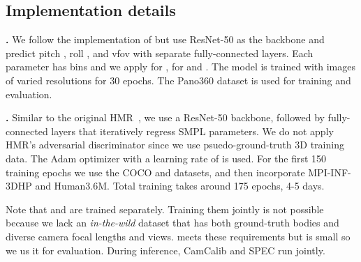 \documentclass[10pt,twocolumn,letterpaper,usenames,dvipsnames]{article}
\begin{document}
\begin{table}[]
    \centering
    \vspace{-0.05in}
    \caption{{\bf Regressing camera parameters.} \camcalib methods are trained and tested on the Pano360 dataset. ScaleNet~\cite{zhu2020single} results use the authors' implementation.
    }
    \vspace{-2ex}
    \label{tab:camcalib}
\end{table}

\subsection{Implementation details}
\label{sec:implementation}

\textbf{\camcalib.} We follow the implementation of \cite{Hold-Geoffroy_2018_CVPR,zhu2020single} but use ResNet-50 as the backbone and predict pitch , roll , and vfov  with separate fully-connected layers. 
Each parameter has  bins and we apply \softbiasedltwo for , \softltwo for  and .
The model is trained with images of varied resolutions for 30 epochs. The Pano360 dataset is used for training and evaluation.

\textbf{\methodname.} 
Similar to the original HMR~\cite{kanazawa_hmr}, we use a ResNet-50 backbone, followed by fully-connected layers that iteratively regress SMPL parameters. 
We do not apply HMR's adversarial discriminator since we use psuedo-ground-truth 3D training data. 
The Adam optimizer with a learning rate of  is used. 
For the first 150 training epochs we use the COCO and \agoracam datasets, and then incorporate MPI-INF-3DHP and Human3.6M. 
Total training takes around 175 epochs, 4-5 days.

Note that \camcalib and \methodname are trained separately. 
Training them jointly is not possible because we lack an \emph{in-the-wild} dataset that has both ground-truth bodies and diverse camera focal lengths and views.
\mtpcam meets these requirements but is small so we us it for evaluation. During inference, CamCalib and SPEC run jointly.
\end{document}
